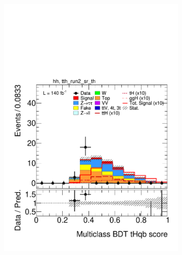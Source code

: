 \begin{figure}[htbp]
  \centering
  \begin{subfigure}[b]{0.49\textwidth}
    \centering
    \includegraphics[width=\textwidth]{images/plots_modelling_run2_run3_variables/run_2_tth/plot_tth_th_multiclass_th_hh_tth_run2_sr_th_15_16_17_18.pdf}
    \caption{}
    \label{fig:overtrain_signal}
  \end{subfigure}
  \hfill
  \begin{subfigure}[b]{0.49\textwidth}
    \centering

\end{subfigure}
\end{figure}
